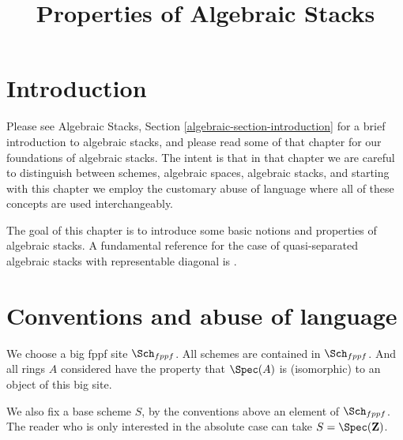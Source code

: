 

%


\title{Properties of Algebraic Stacks}


\maketitle

\label{section-phantom}

\tableofcontents

\section{Introduction}
\label{section-introduction}

\noindent
Please see
Algebraic Stacks, Section \ref{algebraic-section-introduction}
for a brief introduction to algebraic stacks, and please read
some of that chapter for our foundations of algebraic stacks.
The intent is that in that chapter we are careful to distinguish
between schemes, algebraic spaces, algebraic stacks, and starting
with this chapter we employ the customary abuse of language where
all of these concepts are used interchangeably.

\medskip\noindent
The goal of this chapter is to introduce some basic notions and
properties of algebraic stacks. A fundamental
reference for the case of quasi-separated algebraic stacks with representable
diagonal is \cite{LM-B}.



\section{Conventions and abuse of language}
\label{section-conventions}

\noindent
We choose a big fppf site $\Sch_{fppf}$.
All schemes are contained in $\Sch_{fppf}$.
And all rings $A$ considered have the property that
$\Spec(A)$ is (isomorphic) to an object of this big site.

\medskip\noindent
We also fix a base scheme $S$, by the conventions above an element
of $\Sch_{fppf}$. The reader who is only interested
in the absolute case can take $S = \Spec(\mathbf{Z})$.

